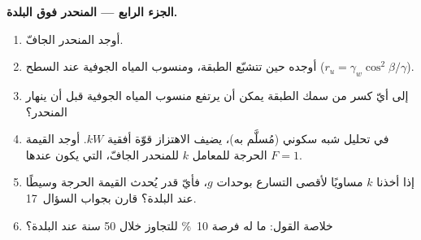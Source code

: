 \begin{problem}
\noindent\textbf{الجزء الرابع --- المنحدر فوق البلدة.}
\begin{enumerate}[resume]
  \item أوجد  المنحدر الجافّ.
  \item أوجده حين تتشبّع الطبقة، ومنسوب المياه الجوفية عند السطح ($r_u =
        \gamma_w\cos^2\beta/\gamma$).
  \item إلى أيّ كسر من سمك الطبقة يمكن أن يرتفع منسوب المياه الجوفية قبل أن ينهار المنحدر؟
  \item في تحليل شبه سكوني (مُسلَّم به)، يضيف الاهتزاز قوّة أفقية $kW$. أوجد
        القيمة الحرجة للمعامل $k$ للمنحدر الجافّ، التي يكون عندها $F = 1$.
  \item إذا أخذنا $k$ مساويًا لأقصى التسارع بوحدات $g$، فأيّ قدر يُحدث القيمة الحرجة
        وسيطًا عند البلدة؟ قارن بجواب السؤال~17.
  \item خلاصة القول: ما  له فرصة \qty{10}{\percent} للتجاوز
        خلال 50 سنة عند البلدة؟
\end{enumerate}
\end{problem}
